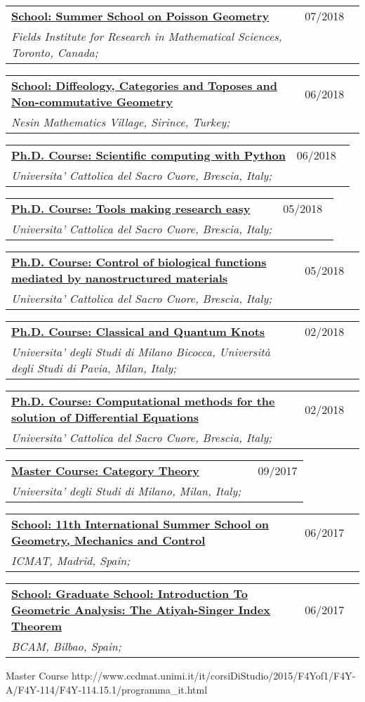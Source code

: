 \documentclass[a4paper]{article}
\newcommand{\longvoice}[8]{
	\begin{tabular}{p{0.83\linewidth} p{0.17\linewidth} }
		\textbf{\href{#3}{#2: #1}} & #4 
		\\ 
		\textit{#5, #6, #7;} & {\small\emph{#8}}
	\end{tabular}
	\vspace{.5em}
}
\begin{document}
		{}
	\longvoice{Summer School on Poisson Geometry}
		{School}
		{https://web.archive.org/web/20190831105310/http://www.fields.utoronto.ca/activities/18-19/poisson-summer-school}
		{07/2018}
		{Fields Institute for Research in Mathematical Sciences}
		{Toronto}
		{Canada}
		{}
	\longvoice{Diffeology, Categories and Toposes and Non-commutative Geometry}
		{School}
		{https://web.archive.org/web/20171123204026/http://www.nesinkoyleri.org/eng/events-detail.php?egitimkod=203\#icerikler}
		{06/2018}
		{Nesin Mathematics Village}
		{Sirince}
		{Turkey}
		{}
	\longvoice{Scientific computing with Python}
		{Ph.D. Course}
		{https://web.archive.org/web/20180604081514/http://dmf.unicatt.it/~della/pythoncourse18/}
		{06/2018}
		{Universita' Cattolica del Sacro Cuore}
		{Brescia}
		{Italy}
		{}
	\longvoice{Tools making research easy}
		{Ph.D. Course}
		{https://web.archive.org/web/20180604080852/http://www.dmf.unicatt.it/kropf/scientifictools18.html}
		{05/2018}
		{Universita' Cattolica del Sacro Cuore}
		{Brescia}
		{Italy}
		{}
	\longvoice{Control of biological functions mediated by nanostructured materials}
		{Ph.D. Course}
		{https://www.dropbox.com/s/8udz4zmfaxr9xb8/1805-Course-Ciofani.pdf?dl=0}
		{05/2018}
		{Universita' Cattolica del Sacro Cuore}
		{Brescia}
		{Italy}
		{}
	\longvoice{Classical and Quantum Knots}
		{Ph.D. Course}
		{https://www.dropbox.com/s/stqvkes58o410zk/1802-Course-RiccaKnots.pdf?dl=0}
		{02/2018}
		{Universita' degli Studi di Milano Bicocca, Università degli Studi di Pavia}
		{Milan}
		{Italy}
		{}
	\longvoice{Computational methods for the solution of Differential Equations}
		{Ph.D. Course}
		{https://www.dropbox.com/s/q2rapau2k49n5t7/1802-Course-NumericalPdeAvella.pdf?dl=0}
		{02/2018}
		{Universita' Cattolica del Sacro Cuore}
		{Brescia}
		{Italy}
		{}
	\longvoice{Category Theory}
		{Master Course}
		{https://web.archive.org/web/20190831103757/http://www.mat.unimi.it/users/mantovani/}
		{09/2017}
		{Universita' degli Studi di Milano}
		{Milan}
		{Italy}
		{}
	\longvoice{11th International Summer School on Geometry, Mechanics and Control}
		{School}
		{https://web.archive.org/web/20170623165825/http://gmcnet.webs.ull.es/?q=activity-detaill/1812}
		{06/2017}
		{ICMAT}
		{Madrid}
		{Spain}
		{}
	\longvoice{Graduate School: Introduction To Geometric Analysis: The Atiyah-Singer Index Theorem}
		{School}
		{https://web.archive.org/web/20170623165642/http://www.bcamath.org/es/workshops/bcam-upv-ehu-graduate-school-geometry}
		{06/2017}
		{BCAM}
		{Bilbao}
		{Spain}
		{}
		{Master Course}
		{http://www.ccdmat.unimi.it/it/corsiDiStudio/2015/F4Yof1/F4Y-A/F4Y-114/F4Y-114.15.1/programma_it.html}
\end{document}
